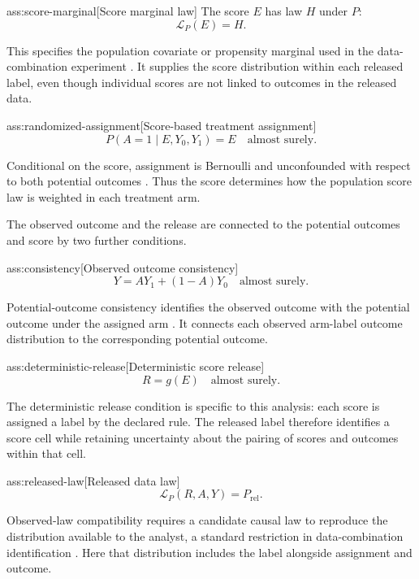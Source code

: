 \begin{assumptionv}{ass:score-marginal}[Score marginal law]
The score \(E\) has law \(H\) under \(P\):
\[
\mathcal L_P(E)=H.
\]
\end{assumptionv}

This specifies the population covariate or propensity marginal used in the data-combination experiment \citep{FanShermanShum2014}. It supplies the score distribution within each released label, even though individual scores are not linked to outcomes in the released data.

\begin{assumptionv}{ass:randomized-assignment}[Score-based treatment assignment]
\[
P(A=1\mid E,Y_0,Y_1)=E
\quad\text{almost surely}.
\]
\end{assumptionv}

Conditional on the score, assignment is Bernoulli and unconfounded with respect to both potential outcomes \citep{FanShermanShum2014}. Thus the score determines how the population score law is weighted in each treatment arm.

The observed outcome and the release are connected to the potential outcomes and score by two further conditions.

\begin{assumptionv}{ass:consistency}[Observed outcome consistency]
\[
Y=AY_1+(1-A)Y_0
\quad\text{almost surely}.
\]
\end{assumptionv}

Potential-outcome consistency identifies the observed outcome with the potential outcome under the assigned arm \citep{Rubin1974}. It connects each observed arm-label outcome distribution to the corresponding potential outcome.

\begin{assumptionv}{ass:deterministic-release}[Deterministic score release]
\[
R=g(E)
\quad\text{almost surely}.
\]
\end{assumptionv}

The deterministic release condition is specific to this analysis: each score is assigned a label by the declared rule. The released label therefore identifies a score cell while retaining uncertainty about the pairing of scores and outcomes within that cell.

\begin{assumptionv}{ass:released-law}[Released data law]
\[
\mathcal L_P(R,A,Y)=P_{\mathrm{rel}}.
\]
\end{assumptionv}

Observed-law compatibility requires a candidate causal law to reproduce the distribution available to the analyst, a standard restriction in data-combination identification \citep{FanShermanShum2014}. Here that distribution includes the label alongside assignment and outcome.

